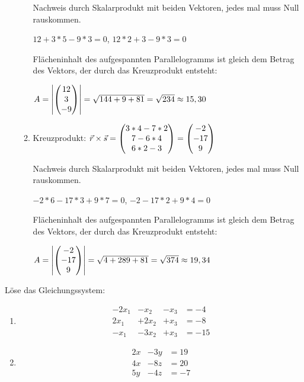 \begin{lsg}{}
\begin{itemize}
\begin{enumerate}
			Nachweis durch Skalarprodukt mit beiden Vektoren, jedes mal muss Null rauskommen.

			$12+3*5-9*3=0$, $12*2+3-9*3=0$

			Flächeninhalt des aufgespannten Parallelogramms ist gleich dem Betrag des Vektors, der durch das Kreuzprodukt entsteht:

			$A=\left|\begin{pmatrix} 12\\3\\-9 \end{pmatrix}\right|=\sqrt{144+9+81}=\sqrt{234}\approx 15,30$
			\item Kreuzprodukt: $\vec r\times \vec s=\begin{pmatrix} 3*4-7*2\\7-6*4\\6*2-3 \end{pmatrix}=\begin{pmatrix} -2\\-17\\9 \end{pmatrix}$

			Nachweis durch Skalarprodukt mit beiden Vektoren, jedes mal muss Null rauskommen.

			$-2*6-17*3+9*7=0$, $-2-17*2+9*4=0$

			Flächeninhalt des aufgespannten Parallelogramms ist gleich dem Betrag des Vektors, der durch das Kreuzprodukt entsteht:

			$A=\left|\begin{pmatrix} -2\\-17\\9 \end{pmatrix}\right|=\sqrt{4+289+81}=\sqrt{374}\approx 19,34$
		\end{enumerate}
	\end{itemize}
\end{lsg}



Löse das Gleichungssystem:
\begin{multicols}{2}
	\begin{enumerate}
		\item
		\begin{alignat*}{4}
			-2x_1& -x_2& - x_3& = -4\\
			2x_1& +2x_2 & + x_3& = -8\\
			-x_1& -3x_2 & + x_3& =-15
		\end{alignat*}
		\item
		\begin{alignat*}{4}
			2x&-3y&=19\\
			4x&-8z&=20\\
			5y&-4z&=-7
		\end{alignat*}
	\end{enumerate}
\end{multicols}


